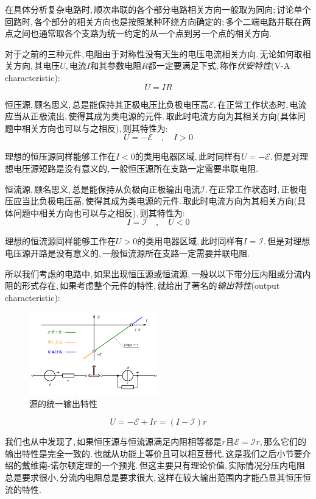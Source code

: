 在具体分析复杂电路时,\,顺次串联的各个部分电路相关方向一般取为同向;\,讨论单个回路时,\,各个部分的相关方向也是按照某种环绕方向确定的;\,多个二端电路并联在两点之间也通常取各个支路为统一约定的从一个点到另一个点的相关方向.

对于之前的三种元件,\,电阻由于对称性没有天生的电压电流相关方向.\,无论如何取相关方向,\,其电压$U$,\,电流$I$和其参数电阻$R$都一定要满足下式,\,称作\emph{伏安特性}(V-A characteristic):
\[U=IR\]

恒压源,\,顾名思义,\,总是能保持其正极电压比负极电压高$\mathscr{E}$.\,在正常工作状态时,\,电流应当从正极流出,\,使得其成为类电源的元件.\,取此时电流方向为其相关方向(具体问题中相关方向也可以与之相反),\,则其特性为:
\[U=-\mathscr{E}\quad ,\quad I>0\]

理想的恒压源同样能够工作在$I<0$的类用电器区域,\,此时同样有$U=-\mathscr{E}$.\,但是对理想电压源短路是没有意义的,\,一般恒压源所在支路一定需要串联电阻.

恒流源,\,顾名思义,\,总是能保持从负极向正极输出电流$\mathscr{I}$.\,在正常工作状态时,\,正极电压应当比负极电压高,\,使得其成为类电源的元件.\,取此时电流方向为其相关方向(具体问题中相关方向也可以与之相反),\,则其特性为:
\[I=\mathscr{I}\quad ,\quad U<0\]

理想的恒流源同样能够工作在$U>0$的类用电器区域,\,此时同样有$I=\mathscr{I}$.\,但是对理想电压源开路是没有意义的,\,一般恒流源所在支路一定需要并联电阻.


所以我们考虑的电路中,\,如果出现恒压源或恒流源,\,一般以以下带分压内阻或分流内阻的形式存在,\,如果考虑整个元件的特性,\,就给出了著名的\emph{输出特性}(output characteristic):
\begin{figure}[H]
\centering
\includegraphics[width=0.5\textwidth]{image/7-3-10.png}
\caption{源的统一输出特性}
\end{figure}
\vspace{-1.5cm}

\[U=-\mathscr{E}+Ir=(I-\mathscr{I})r\]

我们也从中发现了,\,如果恒压源与恒流源满足内阻相等都是$r$且$\mathscr{E}=\mathscr{I}r$,\,那么它们的输出特性是完全一致的.\,也就从功能上等价且可以相互替代,\,这是我们之后小节要介绍的戴维南-诺尔顿定理的一个预兆.\,但这主要只有理论价值,\,实际情况分压内电阻总是要求很小,\,分流内电阻总是要求很大,\,这样在较大输出范围内才能凸显其恒压恒流的特性.

